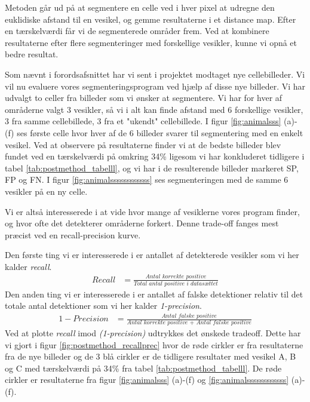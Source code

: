 Metoden går ud på at segmentere en celle ved i hver pixel at udregne den euklidiske afstand til en vesikel, og gemme resultaterne i et distance map. Efter en tærskelværdi får vi de segmenterede områder frem. Ved at kombinere resultaterne efter flere segmenteringer med forskellige vesikler, kunne vi opnå et bedre resultat. 

Som nævnt i forordsafsnittet har vi sent i projektet modtaget nye cellebilleder. Vi vil nu evaluere vores segmenteringsprogram ved hjælp af disse nye billeder. Vi har udvalgt to celler fra billeder som vi ønsker at segmentere. Vi har for hver af områderne valgt 3 vesikler, så vi i alt kan finde afstand med 6 forskellige vesikler, 3 fra samme cellebillede, 3 fra et "ukendt" cellebillede. I figur \ref{fig:animalsss} (a)-(f) ses første celle hvor hver af de 6 billeder svarer til segmentering med en enkelt vesikel. Ved at observere på resultaterne finder vi at de bedste billeder blev fundet ved en tærskelværdi på omkring 34\% ligesom vi har konkluderet tidligere i tabel \ref{tab:postmethod_tabelll}, og vi har i de resulterende billeder markeret SP, FP og FN. I figur \ref{fig:animalssssssssssss} ses segmenteringen med de samme 6 vesikler på en ny celle.

Vi er altså interesserede i at vide hvor mange af vesiklerne vores program finder, og hvor ofte det detekterer områderne forkert. Denne trade-off fanges mest præcist ved en recall-precision kurve\cite{gen}.

Den første ting vi er interesserede i er antallet af detekterede vesikler som vi her kalder \emph{recall}. 
\begin{align}
	Recall &= \frac{\textit{Antal korrekte positive}}{\textit{Total antal positive i datasættet}}
\end{align}
Den anden ting vi er interesserede i er antallet af falske detektioner relativ til det totale antal detektioner som vi her kalder \emph{1-precision}.
\begin{align}
	1-Precision &= \frac{\textit{Antal falske positive}}{\textit{Antal korrekte positive + Antal falske positive}}
\end{align}
Ved at plotte \emph{recall} imod \emph{(1-precision)} udtrykkes det ønskede tradeoff. Dette har vi gjort i figur \ref{fig:postmethod_recallprec} hvor de røde cirkler er fra resultaterne fra de nye billeder og de 3 blå cirkler er de tidligere resultater med vesikel A, B og C med tærskelværdi på 34\% fra tabel \ref{tab:postmethod_tabelll}. De røde cirkler er resultaterne fra figur \ref{fig:animalsss} (a)-(f) og \ref{fig:animalssssssssssss} (a)-(f). 

